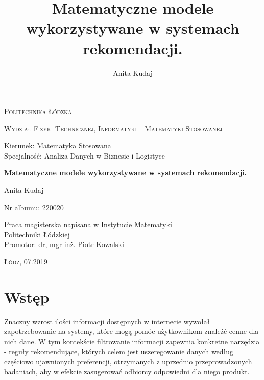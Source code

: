 \documentclass[12pt,a4paper]{report}
\author{Anita Kudaj}
\title{Matematyczne modele wykorzystywane w systemach rekomendacji.}
\begin{document}
\begin{titlepage}
\begin{flushleft}
\end{flushleft}
\begin{center}
\textsc{{\huge Politechnika Łódzka}}
\end{center}
\bigskip
\bigskip
\begin{center}
\textsc{{\Large Wydział Fizyki Technicznej, Informatyki i~Matematyki Stosowanej}}
\end{center}
\bigskip
\bigskip
\begin{Large}
Kierunek: Matematyka Stosowana
\\Specjalność: Analiza Danych w Biznesie i Logistyce

\end{Large}
\bigskip
\bigskip
\noindent\hrulefill
\begin{center}
{\textbf{{\Large Matematyczne modele wykorzystywane w systemach rekomendacji.}}}
\end{center}
\begin{flushright}
{\large 
Anita Kudaj

Nr albumu: 
220020
}
\end{flushright}
\noindent\hrulefill
\bigskip
\bigskip
\begin{center}
{\large Praca magisterska
napisana w Instytucie Matematyki 
\\Politechniki Łódzkiej 
\bigskip
\bigskip
\\Promotor: dr, mgr inż. Piotr Kowalski
 }
\end{center}
\bigskip
\bigskip
\bigskip
\bigskip
\begin{center}
{\textsc{\large Łódź, 07.2019}}
\end{center}
\end{titlepage}


\tableofcontents


\chapter{Wstęp}
Znaczny wzrost ilości informacji dostępnych w internecie wywołał zapotrzebowanie na systemy, które mogą pomóc użytkownikom znaleźć cenne dla nich dane. W tym kontekście filtrowanie informacji zapewnia konkretne narzędzia - reguły rekomendujące, których celem jest uszeregowanie danych według częściowo ujawnionych preferencji, otrzymanych z uprzednio przeprowadzonych badaniach, aby w efekcie zasugerować odbiorcy odpowiedni dla niego produkt. 
\end{document}
